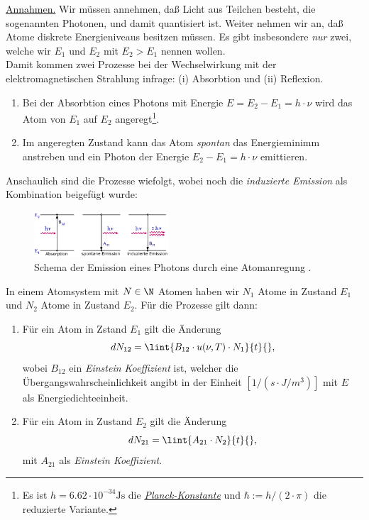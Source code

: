 \documentclass{subfiles}
\begin{document}
                \noindent\underline{Annahmen.} Wir müssen annehmen, daß Licht aus Teilchen besteht, die sogenannten Photonen, und damit quantisiert ist. Weiter nehmen wir an, daß Atome diskrete Energieniveaus besitzen müssen. Es gibt insbesondere \emph{nur} zwei, welche wir $E_1$ und $E_2$ mit $E_2>E_1$ nennen wollen. \\

                Damit kommen zwei Prozesse bei der Wechselwirkung mit der elektromagnetischen Strahlung infrage: (i) Absorbtion und (ii) Reflexion. \\

                \begin{enumerate}[label=\underline{(\roman*)}]
                    \item Bei der Absorbtion eines Photons mit Energie $E=E_2-E_1= h\cdot\nu$ wird das Atom von $E_1$ auf $E_2$ angeregt\footnote{Es ist $h=6.62\cdot 10^{-34}\si{\joule\second}$ die \href{https://de.wikipedia.org/wiki/Planck-Konstante}{\emph{Planck-Konstante}} und $\hbar:=h/(2\cdot\pi)$ die reduzierte Variante.}.
                    \item Im angeregten Zustand kann das Atom \emph{spontan} das Energieminimm anstreben und ein Photon der Energie $E_2-E_1=h\cdot\nu$ emittieren.
                \end{enumerate}

                Anschaulich sind die Prozesse wiefolgt, wobei noch die \emph{induzierte Emission} als Kombination beigefügt wurde:
                \begin{figure}
                    \centering
                    \includegraphics[width=5cm]{Bilddateien/AtomPhotonEmission.gif}
                    \caption[short]{Schema der Emission eines Photons durch eine Atomanregung \cite{uniulm:PlanckStrahlung}.}
                \end{figure}
                In einem Atomsystem mit $N\in\N$ Atomen haben wir $N_1$ Atome in Zustand $E_1$ und $N_2$ Atome in Zustand $E_2$. Für die Prozesse gilt dann:\\

                \begin{enumerate}[label=\underline{(\roman*)}]
                    \item Für ein Atom in Zstand $E_1$ gilt die Änderung 
                    \[dN_{12} =\lint{B_{12}\cdot u(\nu,T)\cdot N_1}{t}{},\]
                    wobei $B_{12}$ ein \emph{Einstein Koeffizient} ist, welcher die Übergangswahrscheinlichkeit angibt in der Einheit $[1/(s\cdot J/m^3)]$ mit $E$ als Energiedichteeinheit. 
                    \item Für ein Atom in Zustand $E_2$ gilt die Änderung
                    \[dN_{21} = \lint{A_{21}\cdot N_2}{t}{},\]
                    mit $A_{21}$ als \emph{Einstein Koeffizient}. 
                \end{enumerate}
\end{document}
